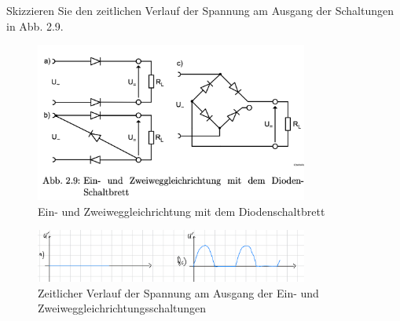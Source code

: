 \documentclass{article}
\theoremstyle{definition}
\begin{document}
\begin{voraufgabe}{Skizzieren Sie den zeitlichen Verlauf der Spannung am Ausgang der Schaltungen in Abb. 2.9.}
    \begin{figure}[H]
        \centering
        \includegraphics[width=0.8\textwidth]{figs/fig2_9.png}
        \caption{Ein- und Zweiweggleichrichtung mit dem Diodenschaltbrett\cite{anleitung}}
        \label{fig:Abb2.9}
    \end{figure}
    \begin{figure}[H]
        \centering
        \includegraphics[width=0.8\textwidth]{figs/fig2_I.png}
        \caption{Zeitlicher Verlauf der Spannung am Ausgang der Ein- und Zweiweggleichrichtungsschaltungen}
        \label{figI}
    \end{figure}
\end{voraufgabe}
\end{document}
